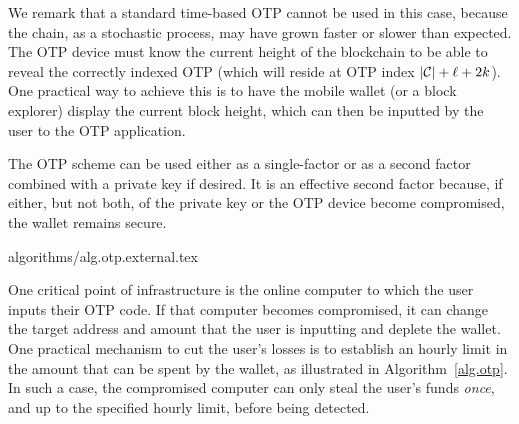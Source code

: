 We remark that a standard time-based OTP cannot be used in this case, because the
chain, as a stochastic process, may have grown faster or slower than expected. The
OTP device must know the current height of the blockchain to be able to reveal the
correctly indexed OTP (which will reside at OTP index $|\mathcal{C}| + \ell + 2k$).
One practical way to achieve this is to have the mobile
wallet (or a block explorer) display the current block height, which can then be
inputted by the user to the OTP application.

The OTP scheme can be used either as a single-factor or as a second factor combined
with a private key if desired. It is an effective second factor because,
if either, but not both, of the private key or the OTP device become compromised,
the wallet remains secure.

{algorithms/alg.otp.external.tex}

One critical point of infrastructure is the online
computer to which the user inputs their OTP code. If that computer becomes
compromised, it can change the target address and amount that the user is
inputting and deplete the wallet. One practical mechanism to cut the user's losses
is to establish an hourly limit in the amount that can be spent by the wallet,
as illustrated in Algorithm~\ref{alg.otp}. In
such a case, the compromised computer can only steal the user's funds \emph{once},
and up to the specified hourly limit, before being detected.
